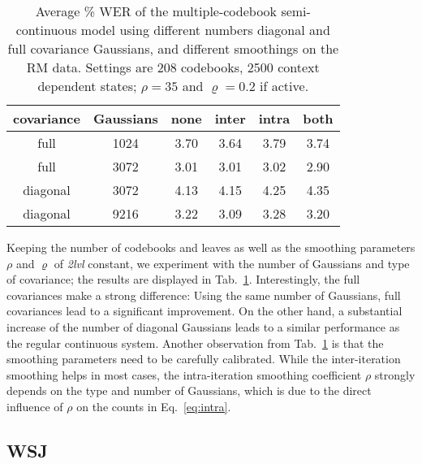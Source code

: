 \documentclass{article}
\begin{document}
\begin{table}%
\begin{center}
\begin{tabular}{|c|c||c|c|c|c|}
\hline
covariance & Gaussians & none & inter & intra & both \\ \hline\hline
full       &      1024 & 3.70 & 3.64 & 3.79 & 3.74 \\ \hline
full       &      3072 & 3.01 & 3.01 & 3.02 & 2.90 \\ \hline\hline
diagonal   &      3072 & 4.13 & 4.15 & 4.25 & 4.35 \\ \hline
diagonal   &      9216 & 3.22 & 3.09 & 3.28 & 3.20 \\ \hline
\end{tabular}
\end{center}
\caption{\label{tab:rm_diagfull}
Average \% WER of the multiple-codebook semi-continuous model using different 
numbers diagonal and full covariance Gaussians, and different smoothings 
on the RM data. 
Settings are 208 codebooks, 2500 context dependent states; $\rho = 35$ 
and $\varrho = 0.2$ if active.
}
\end{table}

Keeping the number of codebooks and leaves as well as the smoothing parameters
$\rho$ and $\varrho$ of {\em 2lvl} constant, we experiment with the number of
Gaussians and type of covariance; the results are displayed in 
Tab.~\ref{tab:rm_diagfull}.
Interestingly, the full covariances make a strong difference: Using the same
number of Gaussians, full covariances lead to a significant improvement.
On the other hand, a substantial increase of the number of diagonal Gaussians 
leads to a similar performance as the regular continuous system.
%
Another observation from Tab.~\ref{tab:rm_diagfull} is that the smoothing
parameters need to be carefully calibrated. While the inter-iteration smoothing
helps in most cases, the intra-iteration smoothing coefficient $\rho$ strongly
depends on the type and number of Gaussians, which is due to the direct influence
of $\rho$ on the counts in Eq.~\ref{eq:intra}.

\subsection{WSJ}
\end{document}
